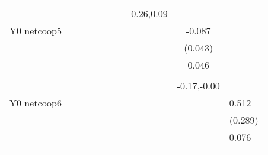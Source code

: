 \begin{table}[!h]
\begin{adjustbox}{width=\columnwidth,center}
\begin{tabular}{l*{8}{c}}
                    &                     &                     &                     &                     &                     &                     &  -0.26,0.09         &                     &                     &                     \\
Y0 netcoop5         &                     &                     &                     &                     &                     &                     &                     &      -0.087\sym{**} &                     &                     \\
                    &                     &                     &                     &                     &                     &                     &                     &     (0.043)         &                     &                     \\
                    &                     &                     &                     &                     &                     &                     &                     &       0.046         &                     &                     \\
                    &                     &                     &                     &                     &                     &                     &                     &                     &                     &                     \\
                    &                     &                     &                     &                     &                     &                     &                     & -0.17,-0.00         &                     &                     \\
Y0 netcoop6         &                     &                     &                     &                     &                     &                     &                     &                     &       0.512\sym{*}  &                     \\
                    &                     &                     &                     &                     &                     &                     &                     &                     &     (0.289)         &                     \\
                    &                     &                     &                     &                     &                     &                     &                     &                     &       0.076         &                     \\
                    &                     &                     &                     &                     &                     &                     &                     &                     &                     &                     \\

\end{tabular}
\end{adjustbox}
\end{table}
